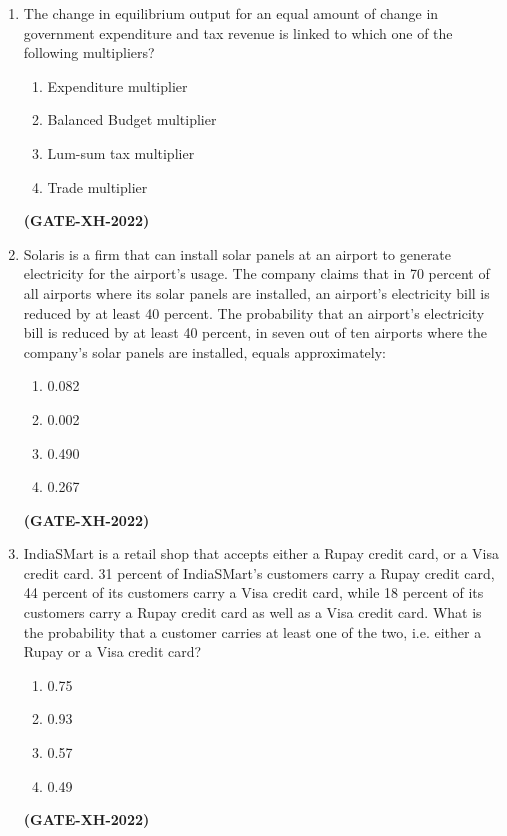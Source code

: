 \documentclass[journal]{IEEEtran}
\begin{document}
\begin{enumerate}
\item The change in equilibrium output for an equal amount of change in government expenditure and tax revenue is linked to which one of the following multipliers?
\begin{multicols}{2}
\begin{enumerate}
\item Expenditure multiplier
\item Balanced Budget multiplier
\item Lum-sum tax multiplier
\item Trade multiplier
\end{enumerate}
\end{multicols}
\hfill\textbf{(GATE-XH-2022)}

\item Solaris is a firm that can install solar panels at an airport to generate electricity for the airport’s usage. The company claims that in 70 percent of all airports where its solar panels are installed, an airport’s electricity bill is reduced by at least 40 percent. The probability that an airport’s electricity bill is reduced by at least 40 percent, in seven out of ten airports where the company’s solar panels are installed, equals approximately:
\begin{multicols}{2}
\begin{enumerate}
\item 0.082
\item 0.002
\item 0.490
\item 0.267
\end{enumerate}
\end{multicols}
\hfill\textbf{(GATE-XH-2022)}

\item IndiaSMart is a retail shop that accepts either a Rupay credit card, or a Visa credit card. 31 percent of IndiaSMart’s customers carry a Rupay credit card, 44 percent of its customers carry a Visa credit card, while 18 percent of its customers carry a Rupay credit card as well as a Visa credit card. What is the probability that a customer carries at least one of the two, i.e. either a Rupay or a Visa credit card?
\begin{multicols}{2}
\begin{enumerate}
\item 0.75
\item 0.93
\item 0.57
\item 0.49
\end{enumerate}
\end{multicols}
\hfill\textbf{(GATE-XH-2022)}


\end{enumerate}
\end{document}
